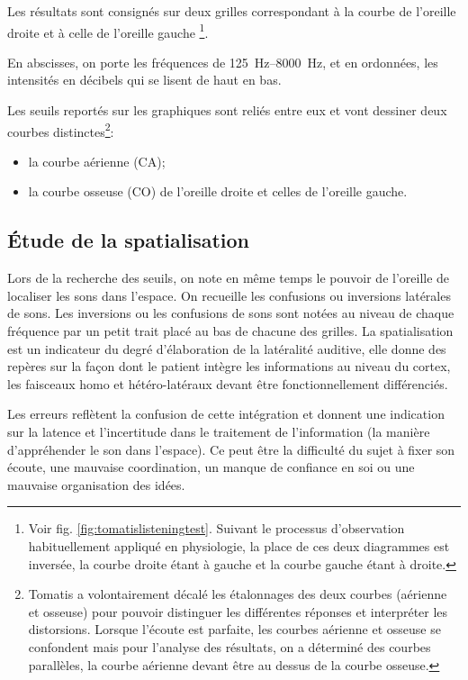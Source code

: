 {Les résultats sont consignés sur deux grilles correspondant à la courbe
de l'oreille droite et à celle de l'oreille gauche%
\footnote{Voir fig. \ref{fig:tomatislisteningtest}. Suivant le processus d'observation habituellement appliqué en physiologie,
la place de ces deux diagrammes est inversée, la courbe droite étant
à gauche et la courbe gauche étant à droite.}.

En abscisses, on porte les fréquences de \SIrange{125}{8000}{\Hz}, et en ordonnées,
les intensités en décibels qui se lisent de haut en bas. 

Les seuils reportés sur les graphiques sont reliés entre eux et vont
dessiner deux courbes distinctes\footnote{Tomatis a volontairement décalé les étalonnages des deux courbes (aérienne
	et osseuse) pour pouvoir distinguer les différentes réponses et interpréter
	les distorsions. Lorsque l'écoute est parfaite, les
	courbes aérienne et osseuse se confondent mais pour l'analyse des
	résultats, on a déterminé des courbes parallèles, la courbe aérienne
	devant être au dessus de la courbe osseuse.}: 
\begin{itemize}
	\item la courbe aérienne (CA);
	\item la courbe osseuse (CO) de l'oreille droite et celles de l'oreille gauche.
\end{itemize}



\subsection{\'Etude de la spatialisation}

Lors de la recherche des seuils, on note en même temps le pouvoir
de l'oreille de localiser les sons dans l'espace. On recueille les
confusions ou inversions latérales de sons. Les inversions ou les
confusions de sons sont notées au niveau de chaque fréquence par un
petit trait placé au bas de chacune des grilles. La spatialisation
est un indicateur du degré d'élaboration de la latéralité auditive,
elle donne des repères sur la façon dont le patient intègre les informations
au niveau du cortex, les faisceaux homo et hétéro-latéraux devant
être fonctionnellement différenciés. 

Les erreurs reflètent la confusion
de cette intégration et donnent une indication sur la latence et l'incertitude
dans le traitement de l'information (la manière d'appréhender le
son dans l'espace). Ce peut être la difficulté du sujet à fixer son
écoute, une mauvaise coordination, un manque de confiance en soi ou
une mauvaise organisation des idées.

}
